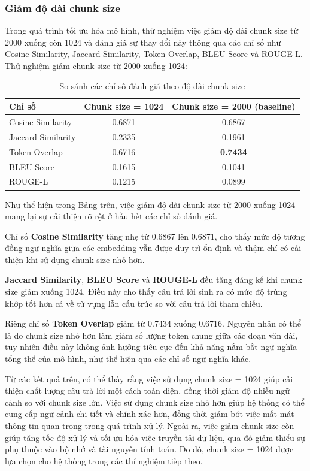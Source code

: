 \subsubsection{Giảm độ dài chunk size}
Trong quá trình tối ưu hóa mô hình, thử nghiệm việc giảm độ dài chunk size từ 2000 xuống còn
1024 và đánh giá sự thay đổi này thông qua các chỉ số như Cosine Similarity, Jaccard Similarity,
Token Overlap, BLEU Score và ROUGE-L.\\
Thử nghiệm giảm chunk size từ 2000 xuống 1024:

\begin{table}[H]
\centering
\caption{So sánh các chỉ số đánh giá theo độ dài chunk size}
\begin{tabular}{lcc}
  \toprule
  \textbf{Chỉ số} & \textbf{Chunk size = 1024} & \textbf{Chunk size = 2000 (baseline)} \\
  \midrule
  Cosine Similarity  & 0.6871          & 0.6867          \\
  Jaccard Similarity & 0.2335          & 0.1961          \\
  Token Overlap      & 0.6716          & \textbf{0.7434} \\
  BLEU Score         & 0.1615          & 0.1041          \\
  ROUGE-L            & 0.1215          & 0.0899          \\
  \bottomrule
\end{tabular}
\end{table}
Như thể hiện trong Bảng trên, việc giảm độ dài chunk size từ 2000 xuống 1024 mang lại sự cải
thiện rõ rệt ở hầu hết các chỉ số đánh giá.
 
Chỉ số \textbf{Cosine Similarity} tăng nhẹ từ 0.6867 lên 0.6871, cho thấy mức độ tương đồng ngữ
nghĩa giữa các embedding vẫn được duy trì ổn định và thậm chí có cải thiện khi sử dụng chunk
size nhỏ hơn.
 
\textbf{Jaccard Similarity}, \textbf{BLEU Score} và \textbf{ROUGE-L} đều tăng đáng kể khi chunk size giảm xuống
1024. Điều này cho thấy câu trả lời sinh ra có mức độ trùng khớp tốt hơn cả về từ vựng lẫn cấu
trúc so với câu trả lời tham chiếu.
 
Riêng chỉ số \textbf{Token Overlap} giảm từ 0.7434 xuống 0.6716. Nguyên nhân có thể là do chunk
size nhỏ hơn làm giảm số lượng token chung giữa các đoạn văn dài, tuy nhiên điều này không
ảnh hưởng tiêu cực đến khả năng nắm bắt ngữ nghĩa tổng thể của mô hình, như thể hiện qua
các chỉ số ngữ nghĩa khác.
 
Từ các kết quả trên, có thể thấy rằng việc sử dụng chunk size = 1024 giúp cải thiện chất
lượng câu trả lời một cách toàn diện, đồng thời giảm độ nhiễu ngữ cảnh so với chunk size lớn.
Việc sử dụng chunk size nhỏ hơn giúp hệ thống có thể cung cấp ngữ cảnh chi tiết và chính xác
hơn, đồng thời giảm bớt việc mất mát thông tin quan trọng trong quá trình xử lý. Ngoài ra,
việc giảm chunk size còn giúp tăng tốc độ xử lý và tối ưu hóa việc truyền tải dữ liệu, qua đó
giảm thiểu sự phụ thuộc vào bộ nhớ và tài nguyên tính toán. Do đó, chunk size = 1024 được
lựa chọn cho hệ thống trong các thí nghiệm tiếp theo.
